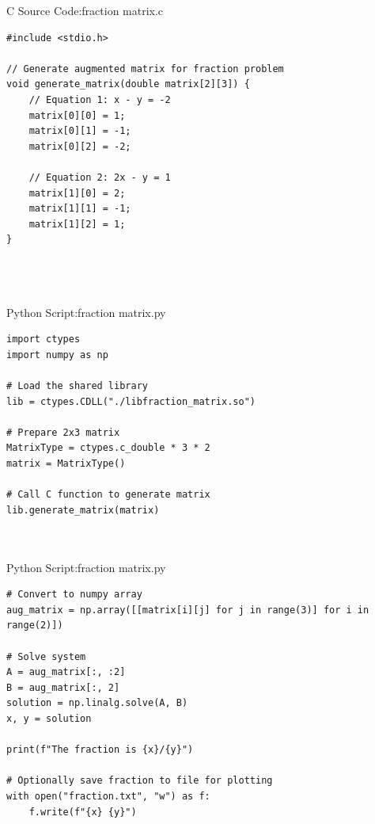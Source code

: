 \documentclass{beamer}
\numberwithin{equation}{section}
\theoremstyle{remark}
\begin{document}
\begin{frame}[fragile]{C Source Code:fraction matrix.c}
\begin{verbatim}
#include <stdio.h>

// Generate augmented matrix for fraction problem
void generate_matrix(double matrix[2][3]) {
    // Equation 1: x - y = -2
    matrix[0][0] = 1;
    matrix[0][1] = -1;
    matrix[0][2] = -2;

    // Equation 2: 2x - y = 1
    matrix[1][0] = 2;
    matrix[1][1] = -1;
    matrix[1][2] = 1;
}




\end{verbatim}
\end{frame}

\begin{frame}[fragile]{Python Script:fraction matrix.py}
\begin{verbatim}
import ctypes
import numpy as np

# Load the shared library
lib = ctypes.CDLL("./libfraction_matrix.so")

# Prepare 2x3 matrix
MatrixType = ctypes.c_double * 3 * 2
matrix = MatrixType()

# Call C function to generate matrix
lib.generate_matrix(matrix)



\end{verbatim}
\end{frame}

\begin{frame}[fragile]{Python Script:fraction matrix.py}
\begin{verbatim}
# Convert to numpy array
aug_matrix = np.array([[matrix[i][j] for j in range(3)] for i in range(2)])

# Solve system
A = aug_matrix[:, :2]
B = aug_matrix[:, 2]
solution = np.linalg.solve(A, B)
x, y = solution

print(f"The fraction is {x}/{y}")

# Optionally save fraction to file for plotting
with open("fraction.txt", "w") as f:
    f.write(f"{x} {y}")

\end{verbatim}
\end{frame}
\end{document}
